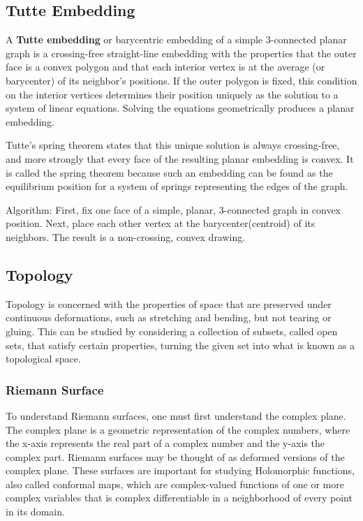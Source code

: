 \documentclass{article}
\begin{document}
 \subsection{Tutte Embedding}
  
  A \textbf{Tutte embedding} or barycentric embedding of a simple 3-connected planar graph is a crossing-free straight-line embedding with the properties that the outer face is a convex polygon and that each interior vertex is at the average (or barycenter) of its neighbor's positions. If the outer polygon is fixed, this condition on the interior vertices determines their position uniquely as the solution to a system of linear equations. Solving the equations geometrically produces a planar embedding. 
  
  Tutte's spring theorem states that this unique solution is always crossing-free, and more strongly that every face of the resulting planar embedding is convex. It is called the spring theorem because such an embedding can be found as the equilibrium position for a system of springs representing the edges of the graph.
  
  Algorithm: First, fix one face of a simple, planar, 3-connected graph in convex position. Next, place each other vertex at the barycenter(centroid) of its neighbors. The result is a non-crossing, convex drawing.
  
 \subsection{Topology}
 Topology is concerned with the properties of space that are preserved under continuous deformations, such as stretching and bending, but not tearing or gluing. This can be studied by considering a collection of subsets, called open sets, that satisfy certain properties, turning the given set into what is known as a topological space. 
  \subsubsection{Riemann Surface}
  To understand Riemann surfaces, one must first understand the complex plane. The complex plane is a geometric representation of the complex numbers, where the x-axis represents the real part of a complex number and the y-axis the complex part. Riemann surfaces may be thought of as deformed versions of the complex plane. These surfaces are important for studying Holomorphic functions, also called conformal maps, which are complex-valued functions of one or more complex variables that is complex differentiable in a neighborhood of every point in its domain.
  
\end{document}
